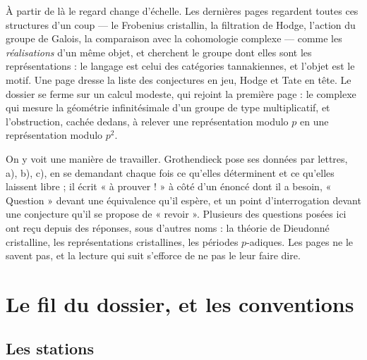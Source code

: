 \documentclass[11pt,a4paper]{article}
\begin{document}
\begin{resume}
À partir de là le regard change d'échelle. Les dernières pages regardent
toutes ces structures d'un coup — le Frobenius cristallin, la filtration de
Hodge, l'action du groupe de Galois, la comparaison avec la cohomologie
complexe — comme les \emph{réalisations} d'un même objet, et cherchent le
groupe dont elles sont les représentations : le langage est celui des
catégories tannakiennes, et l'objet est le motif. Une page dresse la liste des
conjectures en jeu, Hodge et Tate en tête. Le dossier se ferme sur un calcul
modeste, qui rejoint la première page : le complexe qui mesure la géométrie
infinitésimale d'un groupe de type multiplicatif, et l'obstruction, cachée
dedans, à relever une représentation modulo $p$ en une représentation modulo
$p^{2}$.

On y voit une manière de travailler. Grothendieck pose ses données par
lettres, a), b), c), en se demandant chaque fois ce qu'elles déterminent et ce
qu'elles laissent libre ; il écrit « à prouver ! » à côté d'un énoncé dont il a
besoin, « Question » devant une équivalence qu'il espère, et un point
d'interrogation devant une conjecture qu'il se propose de « revoir ».
Plusieurs des questions posées ici ont reçu depuis des réponses, sous d'autres
noms : la théorie de Dieudonné cristalline, les représentations cristallines,
les périodes $p$-adiques. Les pages ne le savent pas, et la lecture qui suit
s'efforce de ne pas le leur faire dire.

\end{resume}

\section*{Le fil du dossier, et les conventions}

\subsection*{Les stations}
\end{document}

